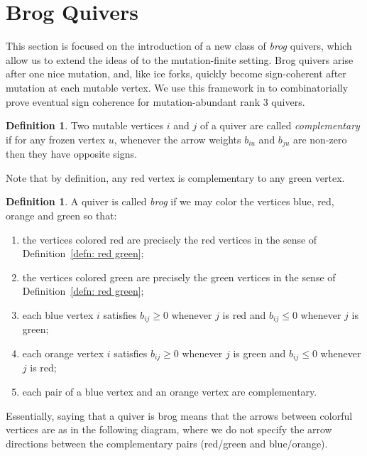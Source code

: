 \documentclass[12pt]{amsart}
\theoremstyle{definition}
\newtheorem{defn}[thm]{Definition}
\newtheorem{definition}[thm]{Definition}
\theoremstyle{remark}
\numberwithin{equation}{section}
\begin{document}
\section{Brog Quivers}
\label{sec:brog}

This section is focused on the introduction of a new class of \emph{brog} quivers, which allow us to extend the ideas of  to the mutation-finite setting.  Brog quivers arise after one nice mutation, and, like ice forks, quickly become sign-coherent after mutation at each mutable vertex.  We use this framework in  to combinatorially prove eventual sign coherence for mutation-abundant rank $3$ quivers. 



\begin{definition}
    Two mutable vertices $i$ and $j$ of a quiver are called \emph{complementary} if for any frozen vertex $u$, whenever the arrow weights $b_{iu}$ and $b_{ju}$ are non-zero then they have opposite signs.
\end{definition}


Note that by definition, any red vertex is complementary to any green vertex.


\begin{defn}
A quiver is called \emph{brog} if we may color the vertices blue, red, orange and green so that:
\begin{enumerate}
\item the vertices colored red are precisely the red vertices in the sense of Definition~\ref{defn: red green}; 
\item the vertices colored green are precisely the green vertices in the sense of Definition~\ref{defn: red green}; 
\item each blue vertex $i$ satisfies $b_{ij} \geq 0$ whenever $j$ is red and $b_{ij} \leq 0$ whenever $j$ is green;
\item each orange vertex $i$ satisfies $b_{ij} \geq 0$ whenever $j$ is green and $b_{ij} \leq 0$ whenever $j$ is red;
\item each pair of a blue vertex and an orange vertex are complementary.
\end{enumerate}
\end{defn}




Essentially, saying that a quiver is brog means that the arrows between colorful vertices are as in the following diagram, where we do not specify the arrow directions between the complementary pairs (red/green and blue/orange).
\end{document}
